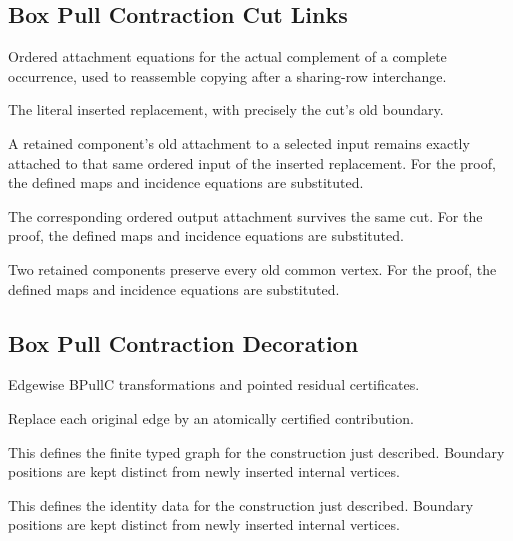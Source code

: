 \subsection{Box Pull Contraction Cut Links}
Ordered attachment equations for the actual complement of a complete occurrence, used to reassemble copying after a sharing-row interchange.

The literal inserted replacement, with precisely the cut's old boundary.
\par{}

A retained component's old attachment to a selected input remains exactly attached to that same ordered input of the inserted replacement.
For the proof, the defined maps and incidence equations are substituted.
\par{}

The corresponding ordered output attachment survives the same cut.
For the proof, the defined maps and incidence equations are substituted.
\par{}

Two retained components preserve every old common vertex.
For the proof, the defined maps and incidence equations are substituted.
\par{}

\subsection{Box Pull Contraction Decoration}
Edgewise BPullC transformations and pointed residual certificates.

Replace each original edge by an atomically certified contribution.
\par{}

This defines the finite typed graph for the construction just described. Boundary positions are kept distinct from newly inserted internal vertices.
\par{}

This defines the identity data for the construction just described. Boundary positions are kept distinct from newly inserted internal vertices.
\par{}

